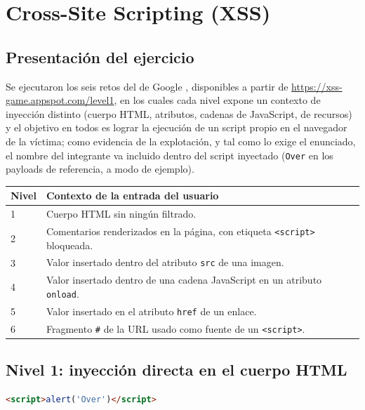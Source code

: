 \section{Cross-Site Scripting (XSS)}

\subsection{Presentación del ejercicio}

Se ejecutaron los seis retos del  de Google \cite{xss-game}, disponibles a partir de \url{https://xss-game.appspot.com/level1}, en los cuales cada nivel expone un contexto de inyección distinto (cuerpo HTML, atributos, cadenas de JavaScript,  de recursos) y el objetivo en todos es lograr la ejecución de un script propio en el navegador de la víctima; como evidencia de la explotación, y tal como lo exige el enunciado, el nombre del integrante va incluido dentro del script inyectado (\texttt{Over} en los payloads de referencia, a modo de ejemplo).

\begin{center}
\small
\begin{tabularx}{0.8\linewidth}{@{}lX@{}}
  \toprule
  \bfseries Nivel & \bfseries Contexto de la entrada del usuario \\
  \midrule
  1 & Cuerpo HTML sin ningún filtrado. \\
  2 & Comentarios renderizados en la página, con etiqueta \texttt{<script>} bloqueada. \\
  3 & Valor insertado dentro del atributo \texttt{src} de una imagen. \\
  4 & Valor insertado dentro de una cadena JavaScript en un atributo \texttt{onload}. \\
  5 & Valor insertado en el atributo \texttt{href} de un enlace. \\
  6 & Fragmento \texttt{\#} de la URL usado como fuente de un \texttt{<script>}. \\
  \bottomrule
\end{tabularx}
\end{center}

\subsection{Nivel 1: inyección directa en el cuerpo HTML}

\begin{lstlisting}[language=HTML]
<script>alert('Over')</script>
\end{lstlisting}

